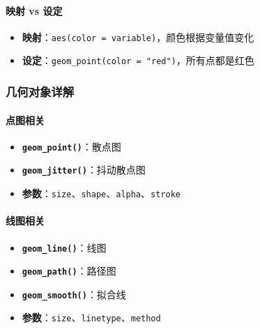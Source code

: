 \documentclass[
  twoside]{book}
\providecommand{\tightlist}{%
  \setlength{\itemsep}{0pt}\setlength{\parskip}{0pt}}
\begin{document}
\hypertarget{ux6620ux5c04-vs-ux8bbeux5b9a}{%
\paragraph{映射 vs 设定}\label{ux6620ux5c04-vs-ux8bbeux5b9a}}

\begin{itemize}
\tightlist
\item
  \textbf{映射}：\texttt{aes(color\ =\ variable)}，颜色根据变量值变化
\item
  \textbf{设定}：\texttt{geom\_point(color\ =\ "red")}，所有点都是红色
\end{itemize}

\hypertarget{ux51e0ux4f55ux5bf9ux8c61ux8be6ux89e3}{%
\subsubsection{几何对象详解}\label{ux51e0ux4f55ux5bf9ux8c61ux8be6ux89e3}}

\hypertarget{ux70b9ux56feux76f8ux5173}{%
\paragraph{点图相关}\label{ux70b9ux56feux76f8ux5173}}

\begin{itemize}
\tightlist
\item
  \textbf{\texttt{geom\_point()}}：散点图
\item
  \textbf{\texttt{geom\_jitter()}}：抖动散点图
\item
  \textbf{参数}：\texttt{size}、\texttt{shape}、\texttt{alpha}、\texttt{stroke}
\end{itemize}

\hypertarget{ux7ebfux56feux76f8ux5173}{%
\paragraph{线图相关}\label{ux7ebfux56feux76f8ux5173}}

\begin{itemize}
\tightlist
\item
  \textbf{\texttt{geom\_line()}}：线图
\item
  \textbf{\texttt{geom\_path()}}：路径图
\item
  \textbf{\texttt{geom\_smooth()}}：拟合线
\item
  \textbf{参数}：\texttt{size}、\texttt{linetype}、\texttt{method}
\end{itemize}
\end{document}
